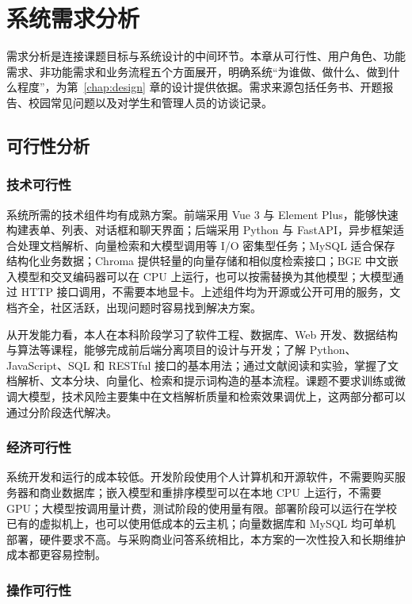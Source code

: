 \chapter{系统需求分析}
\label{chap:requirement}

需求分析是连接课题目标与系统设计的中间环节。本章从可行性、用户角色、功能需求、非功能需求和业务流程五个方面展开，明确系统“为谁做、做什么、做到什么程度”，为第~\ref{chap:design} 章的设计提供依据。需求来源包括任务书、开题报告、校园常见问题以及对学生和管理人员的访谈记录。

\section{可行性分析}
\label{sec:feasibility}

\subsection{技术可行性}

系统所需的技术组件均有成熟方案。前端采用 Vue 3 与 Element Plus，能够快速构建表单、列表、对话框和聊天界面；后端采用 Python 与 FastAPI，异步框架适合处理文档解析、向量检索和大模型调用等 I/O 密集型任务；MySQL 适合保存结构化业务数据；Chroma 提供轻量的向量存储和相似度检索接口；BGE 中文嵌入模型和交叉编码器可以在 CPU 上运行，也可以按需替换为其他模型；大模型通过 HTTP 接口调用，不需要本地显卡。上述组件均为开源或公开可用的服务，文档齐全，社区活跃，出现问题时容易找到解决方案。

从开发能力看，本人在本科阶段学习了软件工程、数据库、Web 开发、数据结构与算法等课程，能够完成前后端分离项目的设计与开发；了解 Python、JavaScript、SQL 和 RESTful 接口的基本用法；通过文献阅读和实验，掌握了文档解析、文本分块、向量化、检索和提示词构造的基本流程。课题不要求训练或微调大模型，技术风险主要集中在文档解析质量和检索效果调优上，这两部分都可以通过分阶段迭代解决。

\subsection{经济可行性}

系统开发和运行的成本较低。开发阶段使用个人计算机和开源软件，不需要购买服务器和商业数据库；嵌入模型和重排序模型可以在本地 CPU 上运行，不需要 GPU；大模型按调用量计费，测试阶段的使用量有限。部署阶段可以运行在学校已有的虚拟机上，也可以使用低成本的云主机；向量数据库和 MySQL 均可单机部署，硬件要求不高。与采购商业问答系统相比，本方案的一次性投入和长期维护成本都更容易控制。

\subsection{操作可行性}

